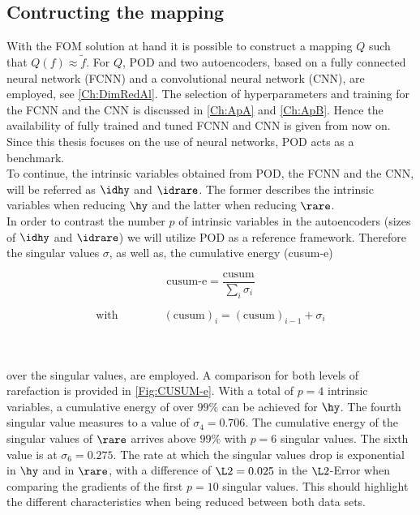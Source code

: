 \subsection{Contructing the mapping}
With the FOM solution at hand it is possible to construct a mapping \(Q\) such that \(Q(f)\approx \tilde{f}\). For \(Q\), POD and two autoencoders, based on a fully connected neural network (FCNN) and a convolutional neural network (CNN), are employed, see \cref{Ch:DimRedAl}. The selection of hyperparameters and training for the FCNN and the CNN is discussed in \cref{Ch:ApA} and \cref{Ch:ApB}. Hence the availability of fully trained and tuned FCNN and CNN is given from now on. Since this thesis focuses on the use of neural networks, POD acts as a benchmark.\\
To continue, the intrinsic variables obtained from POD, the FCNN and the CNN, will be referred as \(\idhy\) and \(\idrare\). The former describes the intrinsic variables when reducing \(\hy\) and the latter when reducing \(\rare\).\\
In order to contrast the number \(p\) of intrinsic variables in the autoencoders (sizes of \(\idhy\) and \(\idrare\)) we will utilize POD as a reference framework. Therefore the singular values \(\sigma\), as well as, the cumulative energy (cusum-e)\\
\noindent \begin{minipage}{.3\linewidth}
	\begin{equation}
	\textrm{cusum-e} = \frac{\textrm{cusum}}{\sum_i \sigma_i}
	\end{equation}
\end{minipage}%
\begin{minipage}{.7\linewidth}
	\begin{equation}
			\textrm{with} \qquad\qquad(\textrm{cusum})_i =(\text{cusum})_{i-1} + \sigma_{i}
	\end{equation}
\end{minipage}\\\\
over the singular values, are employed. A comparison for both levels of rarefaction is provided in \cref{Fig:CUSUM-e}. With a total of \(p=4\) intrinsic variables, a cumulative energy of over \(99\%\) can be achieved for \(\hy\). The fourth singular value measures to a value of \(\sigma_4 = 0.706\). The cumulative energy of the singular values of \(\rare\) arrives above \(99\%\) with \(p=6\) singular values. The sixth value is at \(\sigma_6 = 0.275\). The rate at which the singular values drop is exponential in \(\hy\) and in \(\rare\), with a difference of \(\L2 = 0.025\) in the \(\L2\)-Error when comparing the gradients of the first \(p=10\) singular values. This should highlight the different characteristics when being reduced between both data sets.\\
